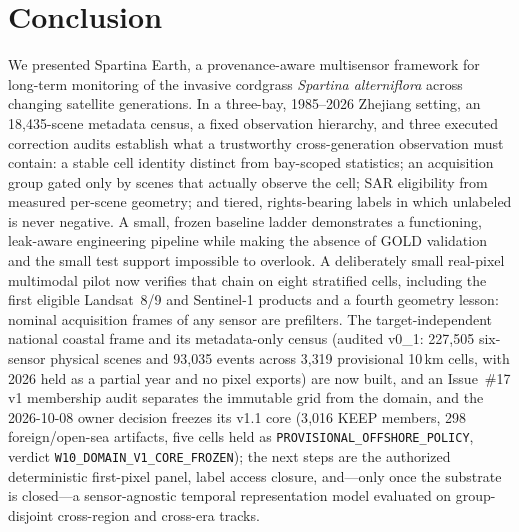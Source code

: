\section{Conclusion}\label{sec:conclusion}

We presented Spartina Earth, a provenance-aware multisensor framework
for long-term monitoring of the invasive cordgrass \emph{Spartina
alterniflora} across changing satellite generations. In a three-bay,
1985--2026 Zhejiang setting, an 18{,}435-scene metadata census, a
fixed observation hierarchy, and three executed correction audits
establish what a trustworthy cross-generation observation must
contain: a stable cell identity distinct from bay-scoped statistics;
an acquisition group gated only by scenes that actually observe the
cell; SAR eligibility from measured per-scene geometry; and tiered,
rights-bearing labels in which unlabeled is never negative. A small,
frozen baseline ladder demonstrates a functioning, leak-aware
engineering pipeline while making the absence of GOLD validation and
the small test support impossible to overlook. A deliberately small real-pixel multimodal pilot now verifies that
chain on eight stratified cells, including the first eligible
Landsat~8/9 and Sentinel-1 products and a fourth geometry lesson:
nominal acquisition frames of any sensor are prefilters. The target-independent national coastal frame and its metadata-only
census (audited v0\_1: 227{,}505 six-sensor physical scenes and
93{,}035 events across 3{,}319 provisional 10\,km cells, with 2026
held as a partial year and no pixel exports) are now built, and an
Issue~\#17 v1 membership audit separates the immutable grid from the
domain, and the 2026-10-08 owner decision freezes its v1.1 core
(3{,}016 KEEP members, 298 foreign/open-sea artifacts, five cells held
as \texttt{PROVISIONAL\_OFFSHORE\_POLICY}, verdict
\texttt{W10\_DOMAIN\_V1\_CORE\_FROZEN});
the next steps are the
authorized deterministic first-pixel panel, label access closure,
and---only once the substrate is closed---a sensor-agnostic temporal
representation model evaluated on group-disjoint cross-region and
cross-era tracks.
